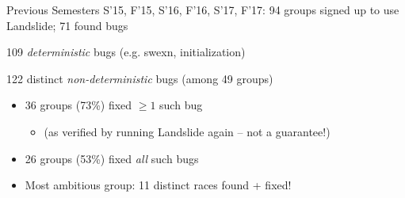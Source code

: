 \documentclass[xcolor=dvipsnames]{beamer}
\begin{document}
\begin{frame}{Previous Semesters}
	S'15, F'15, S'16, F'16, S'17, F'17: 94 groups signed up to use Landslide; 71 found bugs
	\linegap

	109 {\em deterministic} bugs (e.g. swexn, initialization)
	\linegap

	122 distinct {\em non-deterministic} bugs (among 49 groups)
	\begin{itemize}
		\item 36 groups (73\%) fixed $\ge 1$ such bug
			\begin{itemize}
				\item (as verified by running Landslide again -- not a guarantee!)
			\end{itemize}
		\item 26 groups (53\%) fixed {\em all} such bugs
		\item Most ambitious group: 11 distinct races found + fixed!
	\end{itemize}
	\linegap
\end{frame}
\end{document}
